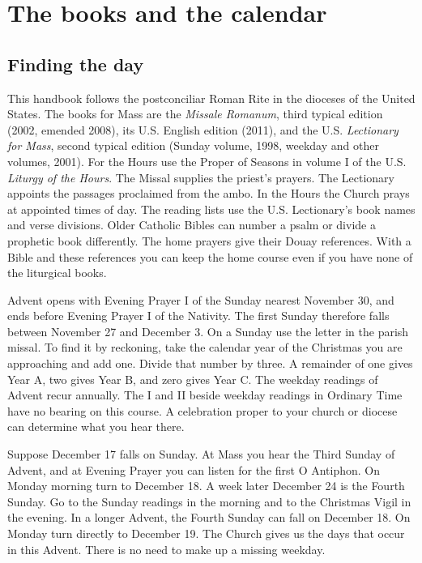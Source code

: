 \section{The books and the calendar}

\subsection{Finding the day}

This handbook follows the postconciliar Roman Rite in the dioceses of the United States. The books for Mass are the \emph{Missale Romanum}, third typical edition (2002, emended 2008), its U.S. English edition (2011), and the U.S. \emph{Lectionary for Mass}, second typical edition (Sunday volume, 1998, weekday and other volumes, 2001). For the Hours use the Proper of Seasons in volume I of the U.S. \emph{Liturgy of the Hours}. The Missal supplies the priest's prayers. The Lectionary appoints the passages proclaimed from the ambo. In the Hours the Church prays at appointed times of day. The reading lists use the U.S. Lectionary’s book names and verse divisions. Older Catholic Bibles can number a psalm or divide a prophetic book differently. The home prayers give their Douay references. With a Bible and these references you can keep the home course even if you have none of the liturgical books.

Advent opens with Evening Prayer I of the Sunday nearest November 30, and ends before Evening Prayer I of the Nativity. The first Sunday therefore falls between November 27 and December 3. On a Sunday use the letter in the parish missal. To find it by reckoning, take the calendar year of the Christmas you are approaching and add one. Divide that number by three. A remainder of one gives Year A, two gives Year B, and zero gives Year C. The weekday readings of Advent recur annually. The I and II beside weekday readings in Ordinary Time have no bearing on this course. A celebration proper to your church or diocese can determine what you hear there.

Suppose December 17 falls on Sunday. At Mass you hear the Third Sunday of Advent, and at Evening Prayer you can listen for the first O Antiphon. On Monday morning turn to December 18. A week later December 24 is the Fourth Sunday. Go to the Sunday readings in the morning and to the Christmas Vigil in the evening. In a longer Advent, the Fourth Sunday can fall on December 18. On Monday turn directly to December 19. The Church gives us the days that occur in this Advent. There is no need to make up a missing weekday.

